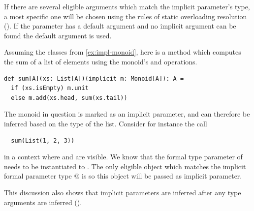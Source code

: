 If there are several eligible arguments which match the implicit
parameter's type, a most specific one will be chosen using the rules
of static overloading resolution ().
If the parameter has a default argument and no implicit argument can
be found the default argument is used.

\example Assuming the classes from \ref{ex:impl-monoid}, here is a 
method which computes the sum of a list of elements using the
monoid's  and  operations.
\begin{lstlisting}
def sum[A](xs: List[A])(implicit m: Monoid[A]): A = 
  if (xs.isEmpty) m.unit
  else m.add(xs.head, sum(xs.tail))
\end{lstlisting}
The monoid in question is marked as an implicit parameter, and can therefore
be inferred based on the type of the list.
Consider for instance the call 
\begin{lstlisting}
  sum(List(1, 2, 3))
\end{lstlisting}
in a context where \lstinline@stringMonoid@ and \lstinline@intMonoid@
are visible.  We know that the formal type parameter \lstinline@a@ of
\lstinline@sum@ needs to be instantiated to \lstinline@Int@. The only
eligible object which matches the implicit formal parameter type
\lstinline@Monoid[Int]@ is \lstinline@intMonoid@ so this object will
be passed as implicit parameter.\bigskip

This discussion also shows that implicit parameters are inferred after
any type arguments are inferred (). 

